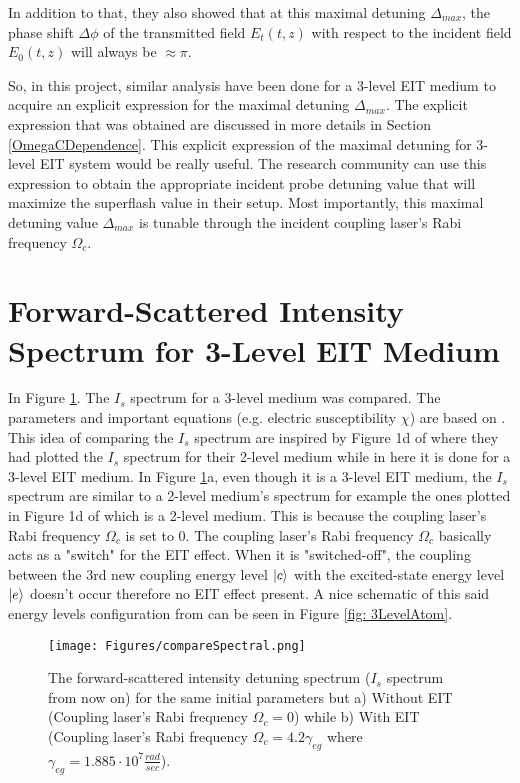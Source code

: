 In addition to that, they also showed that at this maximal detuning $\Delta_{max}$, the phase shift $\Delta\phi$ of the transmitted field $E_{t}(t, z)$ with respect to the incident field $E_{0}(t, z)$ will always be $\approx \pi$.

So, in this project, similar analysis have been done for a 3-level EIT medium to acquire an explicit expression for the maximal detuning $\Delta_{max}$. The explicit expression that was obtained are discussed in more details in Section \ref{OmegaCDependence}. This explicit expression of the maximal detuning for 3-level EIT system would be really useful. The research community can use this expression to obtain the appropriate incident probe detuning value that will maximize the superflash value in their setup. Most importantly, this maximal detuning value $\Delta_{max}$ is tunable through the incident coupling laser's Rabi frequency $\Omega_{c}$.


\section{Forward-Scattered Intensity Spectrum for 3-Level EIT Medium}
In Figure \ref{fig: comparing Is spectrum}. The $I_{s}$ spectrum for a 3-level medium was compared. The parameters and important equations (e.g. electric susceptibility $\chi$) are based on \cite{jeong2010slow}. This idea of comparing the $I_{s}$ spectrum are inspired by Figure 1d of \cite{Kwong2014} where they had plotted the $I_{s}$ spectrum for their 2-level medium while in here it is done for a 3-level EIT medium. In Figure \ref{fig: comparing Is spectrum}a, even though it is a 3-level EIT medium, the $I_{s}$ spectrum are similar to a 2-level medium's spectrum for example the ones plotted in Figure 1d of \cite{Kwong2014} which is a 2-level medium. This is because the coupling laser's Rabi frequency $\Omega_{c}$ is set to $0$. The coupling laser's Rabi frequency $\Omega_{c}$ basically acts as a "switch" for the EIT effect. When it is "switched-off", the coupling between the 3rd new coupling energy level $\ket{c}$ with the excited-state energy level $\ket{e}$ doesn't occur therefore no EIT effect present. A nice schematic of this said energy levels configuration from \cite{Jeong2009} can be seen in Figure \ref{fig: 3LevelAtom}.

\begin{figure}
    \centering
    \texttt{[image: Figures/compareSpectral.png]}
    \caption{The forward-scattered intensity detuning spectrum ($I_{s}$ spectrum from now on) for the same initial parameters but a) Without EIT (Coupling laser's Rabi frequency $\Omega_{c} = 0$) while b) With EIT (Coupling laser's Rabi frequency $\Omega_{c} = 4.2\gamma_{eg}$ where $\gamma_{eg} = 1.885 \cdot 10^{7} \frac{rad}{sec}$).}
    \label{fig: comparing Is spectrum}
\end{figure}

